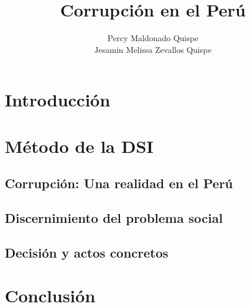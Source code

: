 \documentclass[a4paper,man,natbib]{apa6}
\title{Corrupción en el Perú}
\author{Percy Maldonado Quispe\\Jesamin Melissa Zevallos Quispe}
\affiliation{Universidad Católica San Pablo}
\begin{document}
\maketitle

\section{Introducción}
\section{Método de la DSI}
\subsection{Corrupción: Una realidad en el Perú}
\subsection{Discernimiento del problema social}
\subsection{Decisión y actos concretos}
\section{Conclusión}


\end{document}
